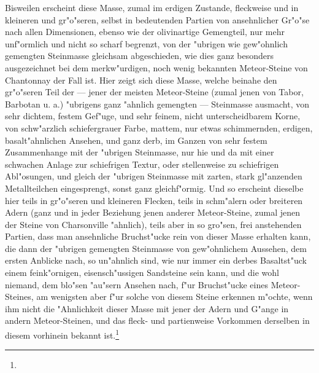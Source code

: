 \documentclass[a4paper, 11pt, oneside, german]{article}
\begin{document}
Bisweilen erscheint diese Masse, zumal im erdigen Zustande, fleckweise und in kleineren und gr"o"seren, selbst in bedeutenden Partien von ansehnlicher Gr"o"se nach allen Dimensionen, ebenso wie der olivinartige Gemengteil, nur mehr unf"ormlich und nicht so scharf begrenzt, von der "ubrigen wie gew"ohnlich gemengten Steinmasse gleichsam abgeschieden, wie dies ganz besonders ausgezeichnet bei dem merkw"urdigen, noch wenig bekannten Meteor-Steine von Chantonnay der Fall ist. Hier zeigt sich diese Masse, welche beinahe den gr"o"seren Teil der --- jener der meisten Meteor-Steine (zumal jenen von Tabor, Barbotan u. a.) "ubrigens ganz "ahnlich gemengten --- Steinmasse ausmacht, von sehr dichtem, festem Gef"uge, und sehr feinem, nicht unterscheidbarem Korne, von schw"arzlich schiefergrauer Farbe, mattem, nur etwas schimmernden, erdigen, basalt"ahnlichen Ansehen, und ganz derb, im Ganzen von sehr festem Zusammenhange mit der "ubrigen Steinmasse, nur hie und da mit einer schwachen Anlage zur schiefrigen Textur, oder stellenweise zu schiefrigen Abl"osungen, und gleich der "ubrigen Steinmasse mit zarten, stark gl"anzenden Metallteilchen eingesprengt, sonst ganz gleichf"ormig. Und so erscheint dieselbe hier teils in gr"o"seren und kleineren Flecken, teils in schm"alern oder breiteren Adern (ganz und in jeder Beziehung jenen anderer Meteor-Steine, zumal jenen der Steine von Charsonville "ahnlich), teils aber in so gro"sen, frei anstehenden Partien, dass man ansehnliche Bruchst"ucke rein von dieser Masse erhalten kann, die dann der "ubrigen gemengten Steinmasse von gew"ohnlichem Aussehen, dem ersten Anblicke nach, so un"ahnlich sind, wie nur immer ein derbes Basaltst"uck einem feink"ornigen, eisensch"ussigen Sandsteine sein kann, und die wohl niemand, dem blo"sen "au"sern Ansehen nach, f"ur Bruchst"ucke eines Meteor-Steines, am wenigsten aber f"ur solche von diesem Steine erkennen m"ochte, wenn ihm nicht die "Ahnlichkeit dieser Masse mit jener der Adern und G"ange in andern Meteor-Steinen, und das fleck- und partienweise Vorkommen derselben in diesem vorhinein bekannt ist.\footnote{}
\end{document}

